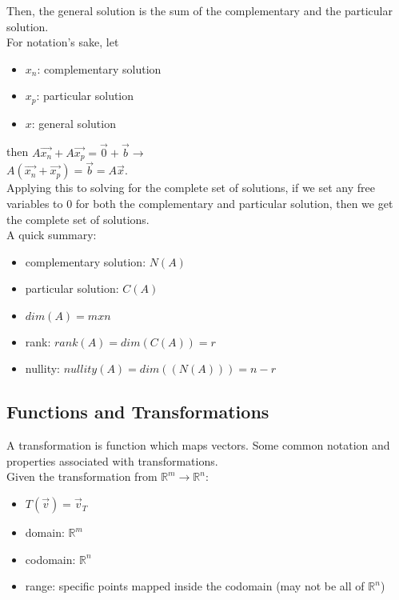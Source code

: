 Then, the general solution is the sum of the complementary and the particular solution.
\\

For notation's sake, let

\begin{itemize}
	\item $x_n$: complementary solution
	\item $x_p$: particular solution
	\item $x$: general solution
\end{itemize}

then $A\vec{x_n} + A\vec{x_p} = \vec{0} + \vec{b} \rightarrow$
\\

$A(\vec{x_n} + \vec{x_p}) = \vec{b} = A\vec{x}$.
\\

Applying this to solving for the complete set of solutions, if we set any free variables to 0 for both the complementary and particular solution, then we get the complete set of solutions.
\\

A quick summary:
\begin{itemize}
	\item complementary solution: $N(A)$
	\item particular solution: $C(A)$
	\item $dim(A) = m x n$
	\item rank: $rank(A) = dim(C(A)) = r$
	\item nullity: $nullity(A) = dim((N(A))) = n-r$
\end{itemize}


\subsection{Functions and Transformations}\label{concept3.3}

A transformation is function which maps vectors. Some common notation and properties associated with transformations.
\\
Given the transformation from $\mathbb{R}^m \rightarrow \mathbb{R}^n$:
\begin{itemize}
	\item $T(\vec{v}) = \vec{v}_T$
	\item domain: $\mathbb{R}^m$
	\item codomain: $\mathbb{R}^n$
	\item range: specific points mapped inside the codomain (may not be all of $\mathbb{R}^n$)
\end{itemize}

